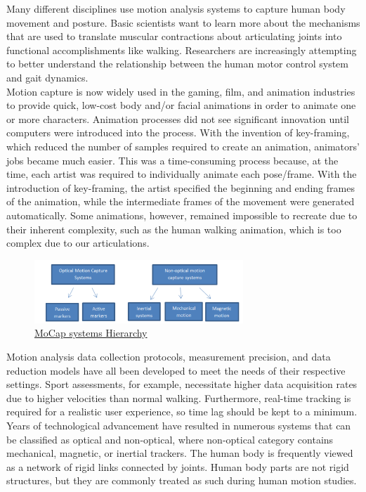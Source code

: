 Many different disciplines use motion analysis systems to capture human body movement and posture. Basic scientists want to learn more about the mechanisms that are used to translate muscular contractions about articulating joints into functional accomplishments like walking. Researchers are increasingly attempting to better understand the relationship between the human motor control system and gait dynamics.\\

Motion capture \cite{Review on Motion Capture Technology} is now widely used in the gaming, film, and animation industries to provide quick, low-cost body and/or facial animations in order to animate one or more characters. Animation processes did not see significant innovation until computers were introduced into the process. With the invention of key-framing, which reduced the number of samples required to create an animation, animators' jobs became much easier. This was a time-consuming process because, at the time, each artist was required to individually animate each pose/frame. With the introduction of key-framing, the artist specified the beginning and ending frames of the animation, while the intermediate frames of the movement were generated automatically. Some animations, however, remained impossible to recreate due to their inherent complexity, such as the human walking animation, which is too complex due to our articulations.

\begin{figure}[h]
	\centering
	\includegraphics[width=0.7\textwidth]{figures/background/Mocap.png}
	\captionsetup{labelformat=empty}
	\caption{\href{https://encrypted-tbn0.gstatic.com/images?q=tbn:ANd9GcRNmJKWXW9WvSq-LKojP9PJvF245HXHpa7DUA&usqp=CAU}
	{MoCap systems Hierarchy}}
\end{figure}

Motion analysis data collection protocols, measurement precision, and data reduction models have all been developed to meet the needs of their respective settings. Sport assessments, for example, necessitate higher data acquisition rates due to higher velocities than normal walking. Furthermore, real-time tracking is required for a realistic user experience, so time lag should be kept to a minimum. Years of technological advancement have resulted in numerous systems that can be classified as optical and non-optical, where non-optical category contains mechanical, magnetic, or inertial trackers. The human body is frequently viewed as a network of rigid links connected by joints. Human body parts are not rigid structures, but they are commonly treated as such during human motion studies.